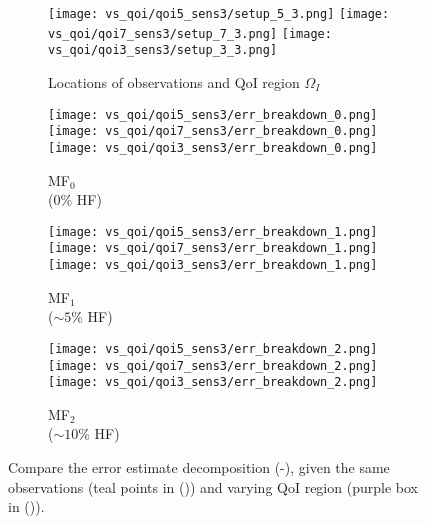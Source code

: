 \begin{figure}
\captionsetup[subfigure]{justification=centering}
\centering
  \begin{subfigure}[t]{0.20\textwidth}
  \centering
    \texttt{[image: vs\_qoi/qoi5\_sens3/setup\_5\_3.png]}
    \texttt{[image: vs\_qoi/qoi7\_sens3/setup\_7\_3.png]}
    \texttt{[image: vs\_qoi/qoi3\_sens3/setup\_3\_3.png]}
    \caption{Locations of observations and QoI region $\Omega_I$}
    \label{subfig:obsSetup}
  \end{subfigure}
  \begin{subfigure}[t]{0.20\textwidth}
  \centering
    \texttt{[image: vs\_qoi/qoi5\_sens3/err\_breakdown\_0.png]}
    \texttt{[image: vs\_qoi/qoi7\_sens3/err\_breakdown\_0.png]}
    \texttt{[image: vs\_qoi/qoi3\_sens3/err\_breakdown\_0.png]}
    \caption{MF$_0$ \\ ($0\%$ HF)}
    \label{subfig:obsLF}
  \end{subfigure}
  \begin{subfigure}[t]{0.20\textwidth}
  \centering
    \texttt{[image: vs\_qoi/qoi5\_sens3/err\_breakdown\_1.png]}
    \texttt{[image: vs\_qoi/qoi7\_sens3/err\_breakdown\_1.png]}
    \texttt{[image: vs\_qoi/qoi3\_sens3/err\_breakdown\_1.png]}
    \caption{MF$_1$ \\ ($\sim5\%$ HF)}
  \end{subfigure}
  \begin{subfigure}[t]{0.20\textwidth}
  \centering
    \texttt{[image: vs\_qoi/qoi5\_sens3/err\_breakdown\_2.png]}
    \texttt{[image: vs\_qoi/qoi7\_sens3/err\_breakdown\_2.png]}
    \texttt{[image: vs\_qoi/qoi3\_sens3/err\_breakdown\_2.png]}
    \caption{MF$_2$ \\ ($\sim10\%$ HF)}
    \label{subfig:obsMFlast}
  \end{subfigure}
  \caption{Compare the error estimate decomposition (-), given the same observations (teal points in ()) and varying QoI region (purple box in ()).}
  \label{fig:qoiStudy}
\end{figure}

